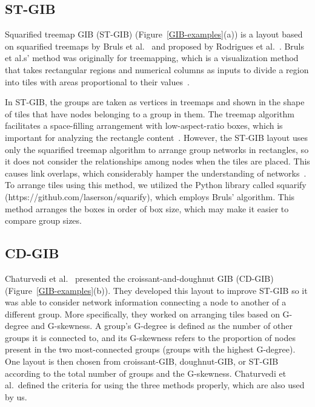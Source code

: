 \documentclass[review]{vgtc}                 %
\begin{document}
\subsection{ST-GIB}
Squarified treemap GIB (ST-GIB) (Figure~\ref{GIB-examples}(a)) is a layout based on squarified treemaps by Bruls et al.~\cite{bruls2000squarified} and proposed by Rodrigues et al.~\cite{rodrigues2011group}.
Bruls et al.s' method was originally for treemapping, which is a visualization method that takes rectangular regions and numerical columns as inputs to divide a region into tiles with areas proportional to their values~\cite{shneiderman1992tree}.

In ST-GIB, the groups are taken as vertices in treemaps and shown in the shape of tiles that have nodes belonging to a group in them.
The treemap algorithm facilitates a space-filling arrangement with low-aspect-ratio boxes, which is important for analyzing the rectangle content~\cite{bruls2000squarified}.
However, the ST-GIB layout uses only the squarified treemap algorithm to arrange group networks in rectangles, so it does not consider the relationships among nodes when the tiles are placed.
This causes link overlaps, which considerably hamper the understanding of networks~\cite{468391,purchase1997aesthetic,purchase1998performance,purchase2002empirical}.
To arrange tiles using this method, we utilized the Python library called squarify (https://github.com/laserson/squarify), which employs Bruls' algorithm. This method arranges the boxes in order of box size, which may make it easier to compare group sizes.

\subsection{CD-GIB}
Chaturvedi et al.~\cite{chaturvedi2014group} presented the croissant-and-doughnut GIB (CD-GIB) (Figure~\ref{GIB-examples}(b)).
They developed this layout to improve ST-GIB so it was able to consider network information connecting a node to another of a different group.
More specifically, they worked on arranging tiles based on G-degree and G-skewness.
A group's G-degree is defined as the number of other groups it is connected to, and its G-skewness refers to the proportion of nodes present in the two most-connected groups (groups with the highest G-degree).
One layout is then chosen from croissant-GIB, doughnut-GIB, or ST-GIB according to the total number of groups and the G-skewness.
Chaturvedi et al.\ defined the criteria for using the three methods properly, which are also used by us.
\end{document}

